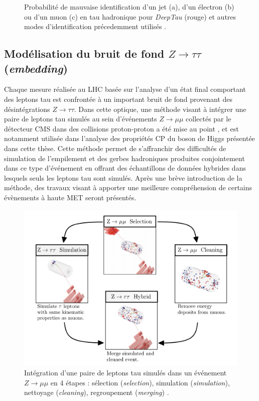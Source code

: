 \begin{figure}
\begin{subfigure}[b]{\linewidth}
        \caption{}
    \end{subfigure}
    \caption{Probabilité de mauvaise identification d'un jet (a), d'un électron (b) ou d'un muon (c) en tau hadronique pour \textit{DeepTau} (rouge) et autres modes d'identification précedemment utilisés \cite{deeptau}.}
    \label{deeptauperf}
\end{figure}

\subsection{Modélisation du bruit de fond $Z\to\tau\tau$ (\textit{embedding})}
\label{embed}

Chaque mesure réalisée au LHC basée sur l'analyse d'un état final comportant des leptons tau est confrontée à un important bruit de fond provenant des désintégrations $Z\rightarrow\tau\tau$. Dans cette optique, une méthode visant à intégrer une paire de leptons tau simulés au sein d'événements $Z\rightarrow\mu\mu$ collectés par le détecteur CMS dans des collisions proton-proton a été mise au point \cite{Embedding}, et est notamment utilisée dans l'analyse des propriétés CP du boson de Higgs présentée dans cette thèse. Cette méthode permet de s'affranchir des difficultés de simulation de l'empilement et des gerbes hadroniques produites conjointement dans ce type d'événement en offrant des échantillons de données hybrides dans lesquels seuls les leptons tau sont simulés. Après une brève introduction de la méthode, des travaux visant à apporter une meilleure compréhension de certains évènements à haute MET seront présentés. \\ 


\begin{figure}
\centering
    \includegraphics[scale=0.38]{Chapitre4/Images/4steps.png} 
    \caption{Intégration d'une paire de leptons tau simulés dans un événement $Z\rightarrow\mu\mu$ en 4 étapes : sélection (\textit{selection}), simulation (\textit{simulation}), nettoyage (\textit{cleaning}), regroupement (\textit{merging}) \cite{Embedding}.}
    \label{4steps}
\end{figure} 

